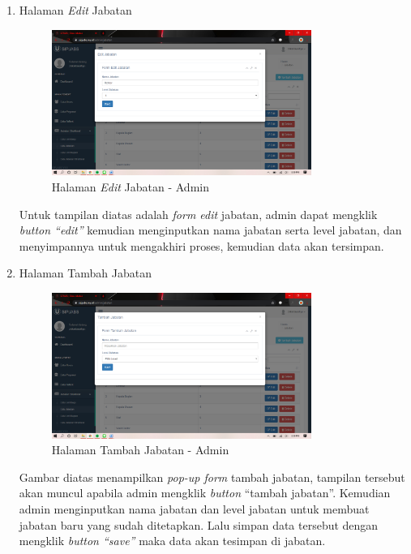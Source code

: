 \begin{enumerate}
	\item Halaman \textit{Edit} Jabatan
	\begin{figure}
		\centering
		\includegraphics[width=0.8\textwidth]
		{pics/admin/implementasi/editjabatan.png}
		\caption{Halaman \textit{Edit} Jabatan - Admin}
		\label{fig:CC10}
	\end{figure}
	Untuk tampilan diatas adalah \textit{form edit} jabatan, admin dapat mengklik \textit{button “edit”} kemudian menginputkan nama jabatan serta level jabatan, dan menyimpannya untuk mengakhiri proses, kemudian data akan tersimpan.
	
	\item Halaman Tambah Jabatan
	\begin{figure}
		\centering
		\includegraphics[width=0.8\textwidth]
		{pics/admin/implementasi/tambahjabatan.png}
		\caption{Halaman Tambah Jabatan - Admin}
		\label{fig:CC10}
	\end{figure}
	Gambar diatas menampilkan \textit{pop-up form} tambah jabatan, tampilan tersebut akan muncul apabila admin mengklik \textit{button} “tambah jabatan”. Kemudian admin menginputkan nama jabatan dan level jabatan untuk membuat jabatan baru yang sudah ditetapkan. Lalu simpan data tersebut dengan mengklik \textit{button “save”} maka data akan tesimpan di jabatan.
	

\end{enumerate}
